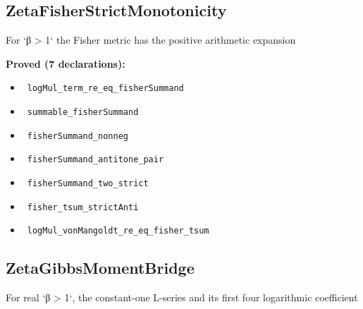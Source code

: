 \documentclass{report}
\theoremstyle{definition}
\begin{document}
\subsection{ZetaFisherStrictMonotonicity}
For `β > 1` the Fisher metric has the positive arithmetic expansion

\noindent\textbf{Proved (7 declarations):}
\begin{itemize}
  \item {}\leanok\ \texttt{logMul\_term\_re\_eq\_fisherSummand}
  \item {}\leanok\ \texttt{summable\_fisherSummand}
  \item {}\leanok\ \texttt{fisherSummand\_nonneg}
  \item {}\leanok\ \texttt{fisherSummand\_antitone\_pair}
  \item {}\leanok\ \texttt{fisherSummand\_two\_strict}
  \item {}\leanok\ \texttt{fisher\_tsum\_strictAnti}
  \item {}\leanok\ \texttt{logMul\_vonMangoldt\_re\_eq\_fisher\_tsum}
\end{itemize}

\subsection{ZetaGibbsMomentBridge}
For real `β > 1`, the constant-one L-series and its first four logarithmic coefficient
\end{document}
